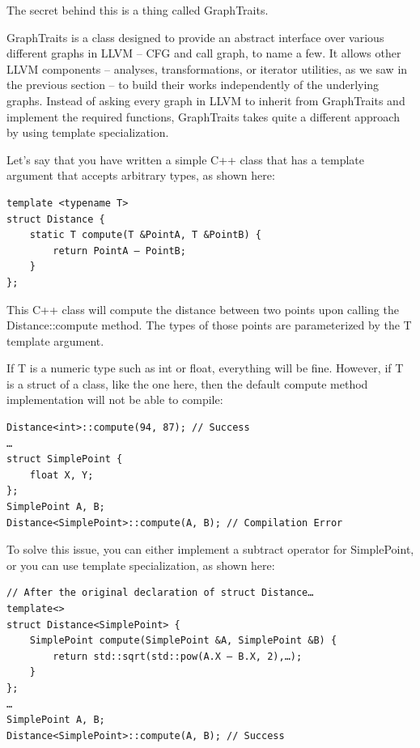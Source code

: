 The secret behind this is a thing called GraphTraits.


GraphTraits is a class designed to provide an abstract interface over various different graphs in LLVM – CFG and call graph, to name a few. It allows other LLVM components – analyses, transformations, or iterator utilities, as we saw in the previous section – to build their works independently of the underlying graphs. Instead of asking every graph in LLVM to inherit from GraphTraits and implement the required functions, GraphTraits takes quite a different approach by using template specialization.

Let's say that you have written a simple C++ class that has a template argument that accepts arbitrary types, as shown here:

\begin{lstlisting}[style=styleCXX]
template <typename T>
struct Distance {
	static T compute(T &PointA, T &PointB) {
		return PointA – PointB;
	}
};
\end{lstlisting}

This C++ class will compute the distance between two points upon calling the Distance::compute method. The types of those points are parameterized by the T template argument.

If T is a numeric type such as int or float, everything will be fine. However, if T is a struct of a class, like the one here, then the default compute method implementation will not be able to compile:

\begin{lstlisting}[style=styleCXX]
Distance<int>::compute(94, 87); // Success
…
struct SimplePoint {
	float X, Y;
};
SimplePoint A, B;
Distance<SimplePoint>::compute(A, B); // Compilation Error
\end{lstlisting}

To solve this issue, you can either implement a subtract operator for SimplePoint, or you can use template specialization, as shown here:

\begin{lstlisting}[style=styleCXX]
// After the original declaration of struct Distance…
template<>
struct Distance<SimplePoint> {
	SimplePoint compute(SimplePoint &A, SimplePoint &B) {
		return std::sqrt(std::pow(A.X – B.X, 2),…);
	}
};
…
SimplePoint A, B;
Distance<SimplePoint>::compute(A, B); // Success
\end{lstlisting}

